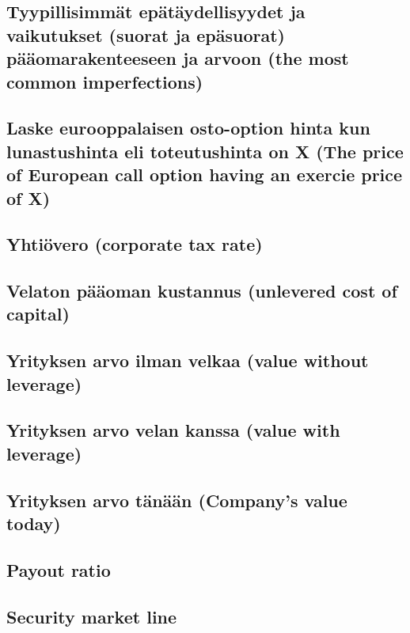 \documentclass[a4paper]{article}
\begin{document}
\subsection{Tyypillisimmät epätäydellisyydet ja vaikutukset (suorat ja epäsuorat) pääomarakenteeseen ja arvoon
(the most common imperfections)}

\subsection{Laske eurooppalaisen osto-option hinta kun lunastushinta eli toteutushinta on X (The price of European call option having an exercie price of X)}

\subsection{Yhtiövero (corporate tax rate)}

\subsection{Velaton pääoman kustannus (unlevered cost of capital)}

\subsection{Yrityksen arvo ilman velkaa (value without leverage)}

\subsection{Yrityksen arvo velan kanssa (value with leverage)}


\subsection{Yrityksen arvo tänään (Company's value today)}

\subsection{Payout ratio}

\subsection{Security market line}
\end{document}
